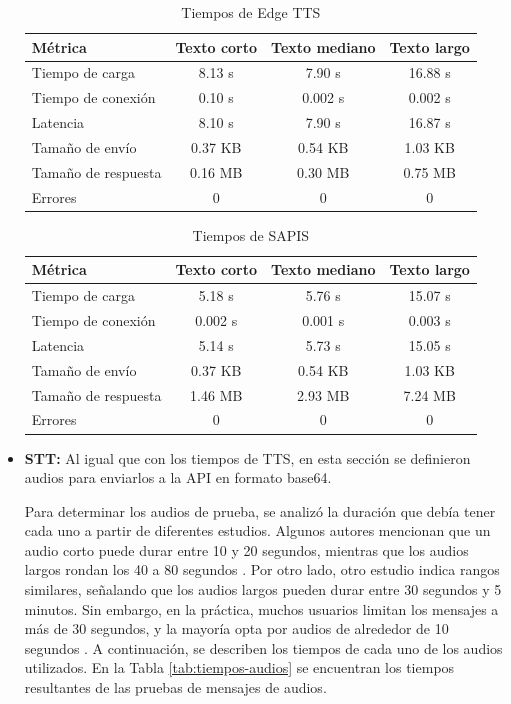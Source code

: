 \documentclass[lettersize,journal]{IEEEtran}
\begin{document}
\begin{itemize}
	\begin{table}[ht]
		\centering
		\caption{Tiempos de Edge TTS}
		\label{tab:tiempos-edge-tts}
		\begin{tabular}{|l|c|c|c|}
			\hline
			\textbf{Métrica} & \textbf{Texto corto} & \textbf{Texto mediano} & \textbf{Texto largo} \\
			\hline
			Tiempo de carga & 8.13 s & 7.90 s & 16.88 s \\
			\hline
			Tiempo de conexión & 0.10 s & 0.002 s & 0.002 s \\
			\hline
			Latencia & 8.10 s & 7.90 s & 16.87 s \\
			\hline
			Tamaño de envío & 0.37 KB & 0.54 KB & 1.03 KB \\
			\hline
			Tamaño de respuesta & 0.16 MB & 0.30 MB & 0.75 MB \\
			\hline
			Errores & 0 & 0 & 0 \\
			\hline
		\end{tabular}
	\end{table}
	
	\begin{table}[ht]
		\centering
		\caption{Tiempos de SAPIS}
		\label{tab:tiempos-sapis}
		\begin{tabular}{|l|c|c|c|}
			\hline
			\textbf{Métrica} & \textbf{Texto corto} & \textbf{Texto mediano} & \textbf{Texto largo} \\
			\hline
			Tiempo de carga & 5.18 s & 5.76 s & 15.07 s \\
			\hline
			Tiempo de conexión & 0.002 s & 0.001 s & 0.003 s \\
			\hline
			Latencia & 5.14 s & 5.73 s & 15.05 s \\
			\hline
			Tamaño de envío & 0.37 KB & 0.54 KB & 1.03 KB \\
			\hline
			Tamaño de respuesta & 1.46 MB & 2.93 MB & 7.24 MB \\
			\hline
			Errores & 0 & 0 & 0 \\
			\hline
		\end{tabular}
	\end{table}
	
	\item \textbf{STT:} 
	\noindent Al igual que con los tiempos de TTS, en esta sección se definieron audios para enviarlos a la API en formato base64.
	
	\noindent Para determinar los audios de prueba, se analizó la duración que debía tener cada uno a partir de diferentes estudios. Algunos autores mencionan que un audio corto puede durar entre 10 y 20 segundos, mientras que los audios largos rondan los 40 a 80 segundos \cite{Tan2024}. Por otro lado, otro estudio indica rangos similares, señalando que los audios largos pueden durar entre 30 segundos y 5 minutos. Sin embargo, en la práctica, muchos usuarios limitan los mensajes a más de 30 segundos, y la mayoría opta por audios de alrededor de 10 segundos \cite{Ghosh2025}. A continuación, se describen los tiempos de cada uno de los audios utilizados. En la Tabla \ref{tab:tiempos-audios} se encuentran los tiempos resultantes de las pruebas de mensajes de audios.
	

\end{itemize}
\end{document}
